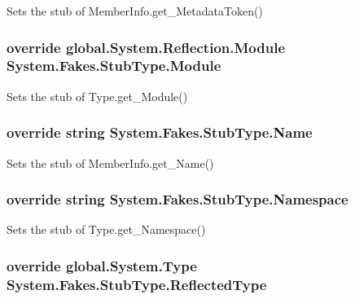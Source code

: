 Sets the stub of Member\-Info.\-get\-\_\-\-Metadata\-Token()

\hypertarget{class_system_1_1_fakes_1_1_stub_type_a099162befbfea4da651c1a88c60a822c}{
\subsubsection[{Module}]{\setlength{\rightskip}{0pt plus 5cm}override global.\-System.\-Reflection.\-Module System.\-Fakes.\-Stub\-Type.\-Module\hspace{0.3cm}{\ttfamily [get]}}}\label{class_system_1_1_fakes_1_1_stub_type_a099162befbfea4da651c1a88c60a822c}


Sets the stub of Type.\-get\-\_\-\-Module()

\hypertarget{class_system_1_1_fakes_1_1_stub_type_acaef953cae5097dbd2aadae71d9df641}{
\subsubsection[{Name}]{\setlength{\rightskip}{0pt plus 5cm}override string System.\-Fakes.\-Stub\-Type.\-Name\hspace{0.3cm}{\ttfamily [get]}}}\label{class_system_1_1_fakes_1_1_stub_type_acaef953cae5097dbd2aadae71d9df641}


Sets the stub of Member\-Info.\-get\-\_\-\-Name()

\hypertarget{class_system_1_1_fakes_1_1_stub_type_ab37630109cc96fc2fc9db251073904ad}{
\subsubsection[{Namespace}]{\setlength{\rightskip}{0pt plus 5cm}override string System.\-Fakes.\-Stub\-Type.\-Namespace\hspace{0.3cm}{\ttfamily [get]}}}\label{class_system_1_1_fakes_1_1_stub_type_ab37630109cc96fc2fc9db251073904ad}


Sets the stub of Type.\-get\-\_\-\-Namespace()

\hypertarget{class_system_1_1_fakes_1_1_stub_type_a571cc0cde0cc08d94834a37a53bcdb4c}{
\subsubsection[{Reflected\-Type}]{\setlength{\rightskip}{0pt plus 5cm}override global.\-System.\-Type System.\-Fakes.\-Stub\-Type.\-Reflected\-Type\hspace{0.3cm}{\ttfamily [get]}}}\label{class_system_1_1_fakes_1_1_stub_type_a571cc0cde0cc08d94834a37a53bcdb4c}


